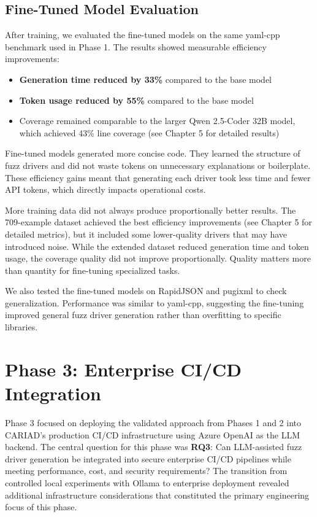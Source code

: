 \subsection{Fine-Tuned Model Evaluation}

After training, we evaluated the fine-tuned models on the same yaml-cpp benchmark used in Phase 1. The results showed measurable efficiency improvements:

\begin{itemize}
    \item \textbf{Generation time reduced by 33\%} compared to the base model
    \item \textbf{Token usage reduced by 55\%} compared to the base model
    \item Coverage remained comparable to the larger Qwen 2.5-Coder 32B model, which achieved 43\% line coverage (see Chapter 5 for detailed results)
\end{itemize}

Fine-tuned models generated more concise code. They learned the structure of fuzz drivers and did not waste tokens on unnecessary explanations or boilerplate. These efficiency gains meant that generating each driver took less time and fewer API tokens, which directly impacts operational costs.

More training data did not always produce proportionally better results. The 709-example dataset achieved the best efficiency improvements (see Chapter 5 for detailed metrics), but it included some lower-quality drivers that may have introduced noise. While the extended dataset reduced generation time and token usage, the coverage quality did not improve proportionally. Quality matters more than quantity for fine-tuning specialized tasks.

We also tested the fine-tuned models on RapidJSON and pugixml to check generalization. Performance was similar to yaml-cpp, suggesting the fine-tuning improved general fuzz driver generation rather than overfitting to specific libraries.

\section{Phase 3: Enterprise CI/CD Integration}
\label{sec:impl_phase3}

Phase 3 focused on deploying the validated approach from Phases 1 and 2 into CARIAD's production CI/CD infrastructure using Azure OpenAI \cite{azure_openai} as the LLM backend. The central question for this phase was \textbf{RQ3}: Can LLM-assisted fuzz driver generation be integrated into secure enterprise CI/CD pipelines while meeting performance, cost, and security requirements? The transition from controlled local experiments with Ollama \cite{ollama} to enterprise deployment revealed additional infrastructure considerations that constituted the primary engineering focus of this phase.

